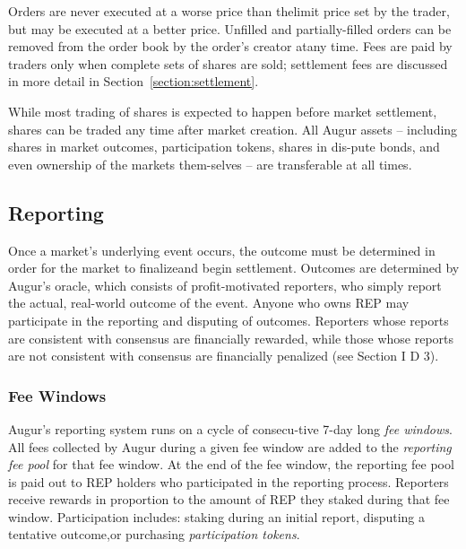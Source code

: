 \documentclass[12pt,floatfix,reprint,nofootinbib,amsmath,amssymb,epsfig,pre,floats,letterpaper,groupedaffiliation]{revtex4-1}
\theoremstyle{definition}
\theoremstyle{definition}
\begin{document}
Orders are never executed at a worse price than the\linebreak limit price set by the trader, but may be executed at a better price. Unfilled and partially-filled orders can be removed from the order book by the order's creator at\linebreak any time. Fees are paid by traders only when complete sets of shares are sold; settlement fees are discussed in more detail in Section~\ref{section:settlement}.

While most trading of shares is expected to happen before market settlement, shares can be traded any time after market creation. All Augur assets -- including shares in market outcomes, participation tokens, shares in dis-\linebreak pute bonds, and even ownership of the markets them-\linebreak selves -- are transferable at all times.

\subsection{Reporting}

Once a market's underlying event occurs, the outcome must be determined in order for the market to finalize\linebreak and begin settlement. Outcomes are determined by Augur's oracle, which consists of profit-motivated reporters, who simply report the actual, real-world outcome of the event. Anyone who owns REP may participate in the reporting and disputing of outcomes. Reporters whose reports are consistent with consensus are financially rewarded, while those whose reports are not consistent with consensus are financially penalized (see Section I D 3).

\subsubsection{Fee Windows}

Augur's reporting system runs on a cycle of consecu-\linebreak tive 7-day long \textit{fee windows}. All fees collected by Augur during a given fee window are added to the \textit{reporting fee pool} for that fee window. At the end of the fee window, the reporting fee pool is paid out to REP holders who participated in the reporting process. Reporters receive rewards in proportion to the amount of REP they staked during that fee window. Participation includes: staking during an initial report, disputing a tentative outcome,\linebreak or purchasing \textit{participation tokens}.
\end{document}
